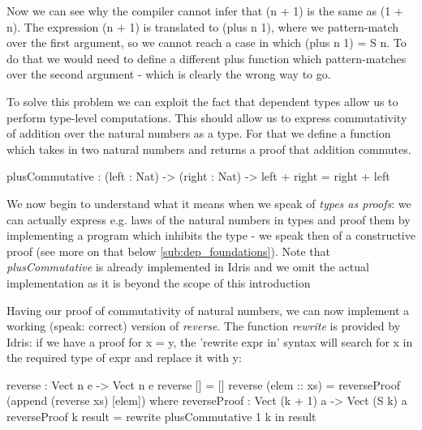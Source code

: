 Now we can see why the compiler cannot infer that (n + 1) is the same as (1 + n). The expression (n + 1) is translated to (plus n 1), where we pattern-match over the first argument, so we cannot reach a case in which (plus n 1) = S n. To do that we would need to define a different plus function which pattern-matches over the second argument - which is clearly the wrong way to go.

To solve this problem we can exploit the fact that dependent types allow us to perform type-level computations. This should allow us to express commutativity of addition over the natural numbers as a type. For that we define a function which takes in two natural numbers and returns a proof that addition commutes. 

\begin{HaskellCode}
plusCommutative : (left : Nat) -> (right : Nat) -> left + right = right + left
\end{HaskellCode}

We now begin to understand what it means when we speak of \textit{types as proofs}: we can actually express e.g. laws of the natural numbers in types and proof them by implementing a program which inhibits the type - we speak then of a constructive proof (see more on that below \ref{sub:dep_foundations}). Note that \textit{plusCommutative} is already implemented in Idris and we omit the actual implementation as it is beyond the scope of this introduction

Having our proof of commutativity of natural numbers, we can now implement a working (speak: correct) version of \textit{reverse}. The function \textit{rewrite} is provided by Idris: if we have a proof for x = y, the 'rewrite expr in' syntax will search for x in the required type of expr and replace it with y:

\begin{HaskellCode}
reverse : Vect n e -> Vect n e
reverse [] = []
reverse (elem :: xs) = reverseProof (append (reverse xs) [elem])
  where
    reverseProof : Vect (k + 1) a -> Vect (S k) a
    reverseProof {k} result = rewrite plusCommutative 1 k in result
\end{HaskellCode}

